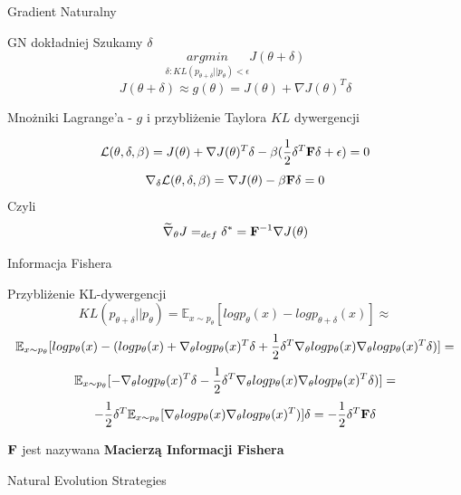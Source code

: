\documentclass[unknownkeysallowed]{beamer}
\begin{document}
\begin{frame}{Gradient Naturalny}
  \begin{block}{GN dokładniej}
    Szukamy $\delta$
    $$\underset{\delta: KL(p_{\theta + \delta} || p_{\theta}) < \epsilon}{argmin} J(\theta + \delta)$$ \pause
    $$J(\theta + \delta) \approx g(\theta) = J(\theta) + \nabla J(\theta)^T \delta $$ \pause

    \end{block}
    \begin{block}{Mnożniki Lagrange'a - $g$ i przybliżenie Taylora $KL$ dywergencji
}
 
    $$\mathcal{L}(\theta, \delta, \beta) = J(\theta) + \nabla J(\theta)^T \delta - \beta(\frac{1}{2}\delta^T \mathbf{F} \delta + \epsilon) = 0$$
    $$\nabla_{\delta} \mathcal{L}(\theta, \delta, \beta) = \nabla J(\theta)  - \beta \mathbf{F} \delta = 0$$\pause
    Czyli
    $$\widetilde{\nabla}_{\theta}J =_{def} \delta^*  = \mathbf{F}^{-1} \nabla J(\theta)$$
     
    \end{block}
    \end{frame}

\begin{frame}{Informacja Fishera}
      \begin{block}{Przybliżenie KL-dywergencji}
    $$KL(p_{\theta + \delta} || p_{\theta}) = \mathbb{E}_{x \sim p_{\theta}}[log p_{\theta}(x) - log p_{\theta + \delta}(x)] \approx$$
    $$\mathbb{E}_{x \sim p_{\theta}}[log p_{\theta}(x) - (log p_{\theta}(x) + \nabla_{\theta} log p_{\theta}(x)^T \delta+ \frac{1}{2} \delta^T \nabla_{\theta} log p_{\theta}(x)\nabla_{\theta} log p_{\theta}(x)^T \delta )] = $$
    $$\mathbb{E}_{x \sim p_{\theta}}[- \nabla_{\theta} log p_{\theta}(x)^T \delta -\frac{1}{2} \delta^T \nabla_{\theta} log p_{\theta}(x)\nabla_{\theta} log p_{\theta}(x)^T \delta )] =$$ \pause
    $$ -\frac{1}{2}\delta^T \mathbb{E}_{x \sim p_{\theta}}[ \nabla_{\theta} log p_{\theta}(x)\nabla_{\theta} log p_{\theta}(x)^T  )] \delta = -\frac{1}{2}\delta^T \mathbf{F} \delta$$

    $\mathbf{F}$ jest nazywana \textbf{Macierzą Informacji Fishera}
  \end{block}

\end{frame}

    
\begin{frame}{Natural Evolution Strategies}
  \begin{algorithm}[H]
\caption{Natural Evolution Strategies}
\end{algorithm}  
\end{frame}
\end{document}
